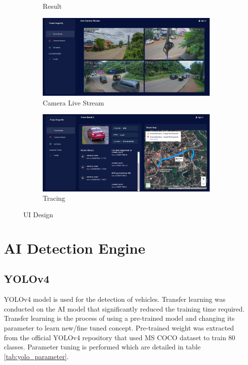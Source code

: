 \begin{figure}[!ht]
\begin{subfigure}[b]{0.48\linewidth}
		\caption{Result}
		\label{fig:result}
	\end{subfigure} \hfill
	\begin{subfigure}[b]{0.48\linewidth}
		\centering
		\includegraphics[width=\linewidth]{Images/UI/live_stream}
		\caption{Camera Live Stream}
		\label{fig:result}
	\end{subfigure} \hfill
	\begin{subfigure}[b]{0.48\linewidth}
		\centering
		\includegraphics[width=\linewidth]{Images/UI/tracing}
		\caption{Tracing}
		\label{fig:tracing}
	\end{subfigure}
	\caption{UI Design}
\end{figure}

\section{AI Detection Engine}
\subsection*{YOLOv4}
YOLOv4 model is used for the detection of vehicles. Transfer learning was conducted on the AI model that significantly reduced the training time required. Transfer learning is the process of using a pre-trained model and changing its parameter to learn new/fine tuned concept. Pre-trained weight was extracted from the official YOLOv4 repository \cite{darknet} that used MS COCO dataset to train 80 classes. Parameter tuning is performed which are detailed in table \ref{tab:yolo_parameter}.

